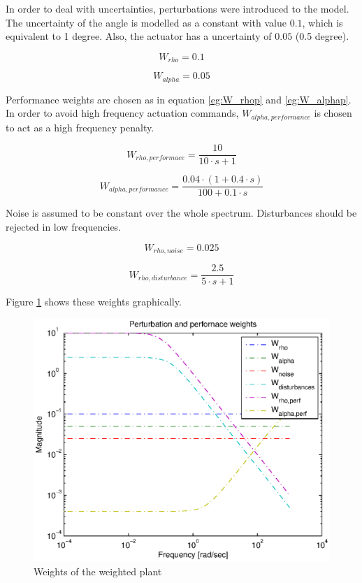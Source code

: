 \documentclass[conference]{IEEEtran}
\begin{document}
In order to deal with uncertainties, perturbations were introduced to the model. The uncertainty of the angle is modelled as a constant with value $0.1$, which is equivalent to 1 degree. Also, the actuator has a uncertainty of $0.05$ (0.5 degree).

\begin{equation}
\label{eg:W_rho}
{W_{rho}} = 0.1
\end{equation}

\begin{equation}
{W_{alpha}} = 0.05
\end{equation}

Performance weights are chosen as in equation \ref{eg:W_rhop} and \ref{eg:W_alphap}. In order to avoid high frequency actuation commands, $W_{alpha,performance}$ is chosen to act as a high frequency penalty.

\begin{equation}
\label{eg:W_rhop}
{W_{rho,performace}} = \frac{{10}}{{10 \cdot s + 1}}
\end{equation}

\begin{equation}
\label{eg:W_alphap}
{W_{alpha,performance}} = \frac{{0.04 \cdot \left( {1 + 0.4 \cdot s} \right)}}{{100 + 0.1 \cdot s}}
\end{equation}

Noise is assumed to be constant over the whole spectrum. Disturbances should be rejected in low frequencies.

\begin{equation}
{W_{rho,noise}} = 0.025
\end{equation}

\begin{equation}
{W_{rho,disturbance}} = \frac{{2.5}}{{5 \cdot s + 1}}
\end{equation}

Figure \ref{figure:weights} shows these weights graphically.

\begin{figure}[h]
\centering
  \includegraphics[width=.47\textwidth]{pics/weights.eps} 
  \caption{Weights of the weighted plant}  
  \label{figure:weights}
\end{figure}
\end{document}
